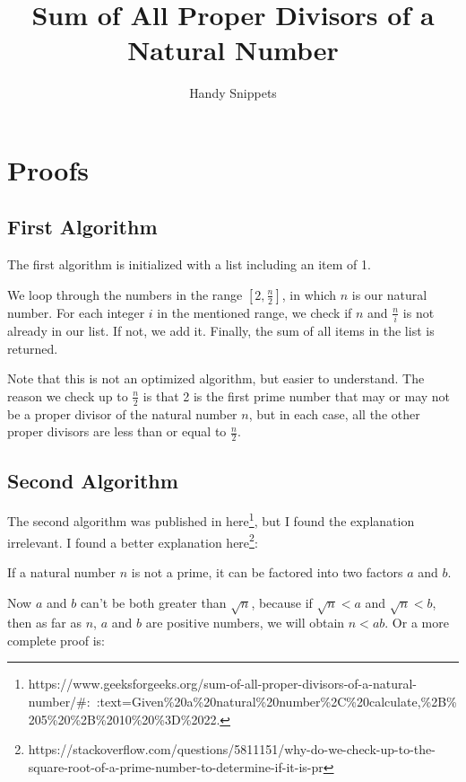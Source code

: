 \documentclass{article}
\author{Handy Snippets}
\title{Sum of All Proper Divisors of a Natural Number}
\begin{document}
\maketitle

\section{Proofs}

\subsection{First Algorithm}

The first algorithm is initialized with a list including an item of 1.

We loop through the numbers in the range $[2, \frac{n}{2}]$, in which $n$ is
our natural number. For each integer $i$ in the mentioned range, we check if
$n$ and $\frac{n}{i}$ is not already in our list. If not, we add it. Finally, 
the sum of all items in the list is returned.

Note that this is not an optimized algorithm, but easier to understand. The 
reason we check up to $\frac{n}{2}$ is that 2 is the first prime number that 
may or may not be a proper divisor of the natural number $n$, but in each case,
 all the other proper divisors are less than or equal to $\frac{n}{2}$.


\subsection{Second Algorithm}

The second algorithm was published in here\footnote{https://www.geeksforgeeks.org/sum-of-all-proper-divisors-of-a-natural-number/\#:~:text=Given\%20a\%20natural\%20number\%2C\%20calculate,\%2B\%205\%20\%2B\%2010\%20\%3D\%2022.},
but I found the explanation irrelevant. I found a better explanation here\footnote{https://stackoverflow.com/questions/5811151/why-do-we-check-up-to-the-square-root-of-a-prime-number-to-determine-if-it-is-pr}:

If a natural number $n$ is not a prime, it can be factored into two factors 
$a$ and $b$.

Now $a$ and $b$ can't be both greater than $\sqrt{n}$, because if $\sqrt{n} < a$
and $\sqrt{n} < b$, then as far as $n$, $a$ and $b$ are positive numbers, 
we will obtain $n < ab$. Or a more complete proof is:
\end{document}
